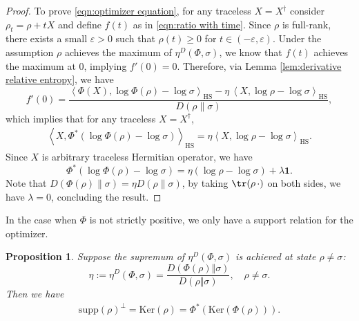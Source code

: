 \documentclass[11pt,reqno]{amsart}
\numberwithin{equation}{section}
\newtheorem{prop}[lemma]{Proposition}
\newcommand{\HS}[2]{\left\langle #1,#2\right\rangle_{\mathrm{HS}}} %
\begin{document}
\begin{proof}
To prove \eqref{eqn:optimizer equation}, for any traceless $X=X^{\dagger}$ consider $\rho_{t}=\rho+tX$ and define $f(t)$ as in \eqref{eqn:ratio with time}. Since $\rho$ is full-rank, there exists a small $\varepsilon>0$ such that $\rho(t)\ge 0$ for $t \in (-\varepsilon,\varepsilon)$. Under the assumption $\rho$ achieves the maximum of $\eta^D(\Phi,\sigma)$, we know that $f(t)$ achieves the maximum at $0$, implying $f'(0)=0$. Therefore, via Lemma \ref{lem:derivative relative entropy}, we have 
\begin{equation}
    f'(0) = \frac{\HS{\Phi(X)}{\log \Phi(\rho) - \log \sigma}-\eta\, \HS{X}{\log \rho - \log \sigma}}{D(\rho \|\sigma)},
\end{equation}
which implies that for any traceless $X=X^{\dagger}$, 
\begin{align*}
    \HS{X}{ \Phi^*(\log \Phi(\rho) - \log \sigma)} = \eta \HS{X}{\log \rho - \log \sigma}. 
\end{align*}
Since $X$ is arbitrary traceless Hermitian operator, we have 
\begin{equation}
     \Phi^*(\log \Phi(\rho) - \log \sigma) = \eta(\log \rho - \log \sigma) + \lambda \textbf{1}.
\end{equation}
Note that $D(\Phi(\rho)\|\sigma) = \eta D(\rho \|\sigma)$, by taking $\tr(\rho\, \cdot)$ on both sides, we have $\lambda = 0$, concluding the result. 
\end{proof}
In the case when $\Phi$ is not strictly positive, we only have a support relation for the optimizer.
\begin{prop}\label{prop:support relation}
    Suppose the supremum of $\eta^D(\Phi,\sigma)$ is achieved at state $\rho \neq \sigma$:
    $$\eta:= \eta^D(\Phi,\sigma) = \frac{D(\Phi(\rho)\Vert\sigma)}
                {D(\rho\Vert\sigma)},\quad \rho \neq \sigma.$$
Then we have \begin{align*}
    \mathrm{supp}(\rho)^\perp = \mathrm{Ker}(\rho) = \Phi^*(\mathrm{Ker}(\Phi(\rho))).
\end{align*}
\end{prop}
\end{document}

